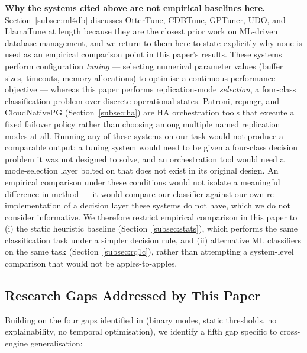 \documentclass[iicol,pdflatex,sn-mathphys-num]{sn-jnl}
\theoremstyle{thmstyleone}
\theoremstyle{thmstylethree}
\begin{document}
\textbf{Why the systems cited above are not empirical baselines
here.} Section~\ref{subsec:ml4db} discusses OtterTune, CDBTune,
GPTuner, UDO, and LlamaTune at length because they are the closest
prior work on ML-driven database management, and we return to them
here to state explicitly why none is used as an empirical comparison
point in this paper's results. These systems perform configuration
\emph{tuning} --- selecting numerical parameter values (buffer sizes,
timeouts, memory allocations) to optimise a continuous performance
objective --- whereas this paper performs replication-mode
\emph{selection}, a four-class classification problem over discrete
operational states. Patroni, repmgr, and CloudNativePG
(Section~\ref{subsec:ha}) are HA orchestration tools that execute a
fixed failover policy rather than choosing among multiple named
replication modes at all. Running any of these systems on our task
would not produce a comparable output: a tuning system would need to
be given a four-class decision problem it was not designed to solve,
and an orchestration tool would need a mode-selection layer bolted on
that does not exist in its original design. An empirical comparison
under these conditions would not isolate a meaningful difference in
method --- it would compare our classifier against our own
re-implementation of a decision layer these systems do not have,
which we do not consider informative. We therefore restrict empirical
comparison in this paper to (i) the static heuristic baseline
(Section~\ref{subsec:stats}), which performs the same classification
task under a simpler decision rule, and (ii) alternative ML
classifiers on the same task (Section~\ref{subsec:rq1c}), rather than
attempting a system-level comparison that would not be apples-to-apples.

\subsection{Research Gaps Addressed by This Paper}\label{subsec:gaps}

Building on the four gaps identified in \cite{iaha2026} (binary modes,
static thresholds, no explainability, no temporal optimisation), we
identify a fifth gap specific to cross-engine generalisation:
\end{document}

